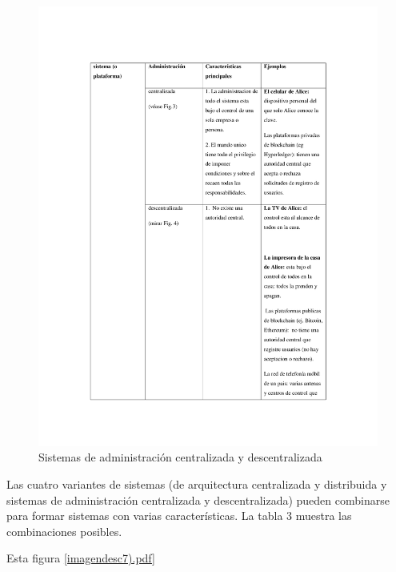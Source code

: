 \documentclass[12pt]{report} %
\begin{document}
\begin{figure}
\centering
\includegraphics[width=0.85\columnwidth]{imagenes/imagendesc6.pdf}
\caption{Sistemas de administración centralizada y descentralizada}
\label{imagendesc6}
\end{figure} 

Las cuatro variantes de sistemas (de arquitectura centralizada y distribuida y sistemas de administración centralizada y descentralizada) pueden combinarse para formar sistemas con varias características. La tabla 3 muestra las combinaciones posibles.

Esta figura \ref{imagendesc7).pdf}
\end{document}
